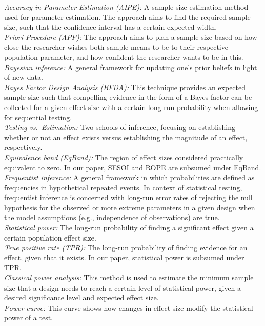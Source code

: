 \documentclass[
  english,
  man,floatsintext]{apa6}
\begin{document}
\emph{Accuracy in Parameter Estimation (AIPE):} A sample size estimation method used for parameter estimation. The approach aims to find the required sample size, such that the confidence interval has a certain expected width.\\
\emph{Priori Procedure (APP):} The approach aims to plan a sample size based on how close the researcher wishes both sample means to be to their respective population parameter, and how confident the researcher wants to be in this.\\
\emph{Bayesian inference:} A general framework for updating one's prior beliefs in light of new data.\\
\emph{Bayes Factor Design Analysis (BFDA):} This technique provides an expected sample size such that compelling evidence in the form of a Bayes factor can be collected for a given effect size with a certain long-run probability when allowing for sequential testing.\\
\emph{Testing vs.~Estimation:} Two schools of inference, focusing on establishing whether or not an effect exists versus establishing the magnitude of an effect, respectively.\\
\emph{Equivalence band (EqBand):} The region of effect sizes considered practically equivalent to zero. In our paper, SESOI and ROPE are subsumed under EqBand.\\
\emph{Frequentist inference:} A general framework in which probabilities are defined as frequencies in hypothetical repeated events. In context of statistical testing, frequentist inference is concerned with long-run error rates of rejecting the null hypothesis for the observed or more extreme parameters in a given design when the model assumptions (e.g., independence of observations) are true.\\
\emph{Statistical power:} The long-run probability of finding a significant effect given a certain population effect size.\\
\emph{True positive rate (TPR):} The long-run probability of finding evidence for an effect, given that it exists. In our paper, statistical power is subsumed under TPR.\\
\emph{Classical power analysis:} This method is used to estimate the minimum sample size that a design needs to reach a certain level of statistical power, given a desired significance level and expected effect size.\\
\emph{Power-curve:} This curve shows how changes in effect size modify the statistical power of a test.\\
\end{document}
